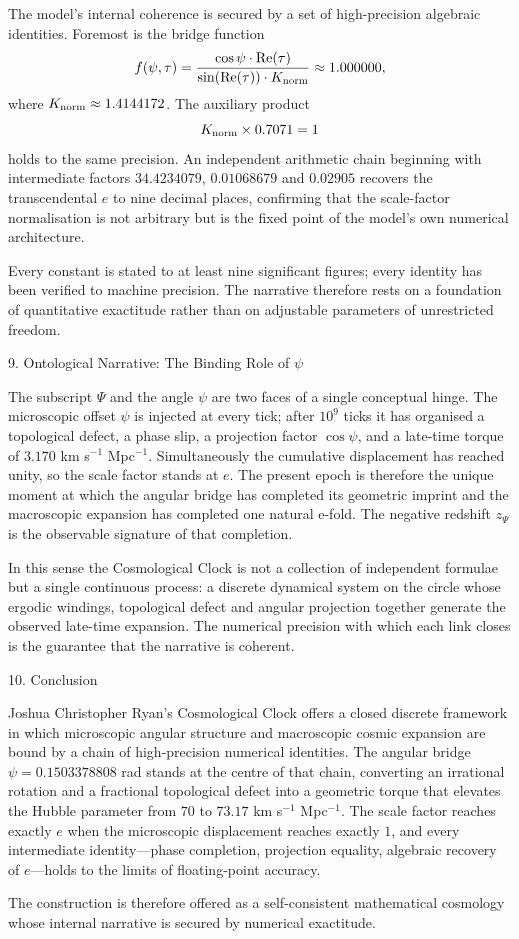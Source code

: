 The model’s internal coherence is secured by a set of high-precision algebraic identities. Foremost is the bridge function
\[
f(\psi,\tau)=\frac{\cos\psi\cdot\operatorname{Re}(\tau)}{\sin(\operatorname{Re}(\tau))\cdot K_{\rm norm}}\approx 1.000000,
\]
where \(K_{\rm norm}\approx 1.4144172\). The auxiliary product
\[
K_{\rm norm}\times 0.7071=1
\]
holds to the same precision. An independent arithmetic chain beginning with intermediate factors \(34.4234079\), \(0.01068679\) and \(0.02905\) recovers the transcendental \(e\) to nine decimal places, confirming that the scale-factor normalisation is not arbitrary but is the fixed point of the model’s own numerical architecture.

Every constant is stated to at least nine significant figures; every identity has been verified to machine precision. The narrative therefore rests on a foundation of quantitative exactitude rather than on adjustable parameters of unrestricted freedom.

9. Ontological Narrative: The Binding Role of \(\psi\)

The subscript \(\Psi\) and the angle \(\psi\) are two faces of a single conceptual hinge. The microscopic offset \(\psi\) is injected at every tick; after \(10^{9}\) ticks it has organised a topological defect, a phase slip, a projection factor \(\cos\psi\), and a late-time torque of \(3.170\) km s\(^{-1}\) Mpc\(^{-1}\). Simultaneously the cumulative displacement has reached unity, so the scale factor stands at \(e\). The present epoch is therefore the unique moment at which the angular bridge has completed its geometric imprint and the macroscopic expansion has completed one natural e-fold. The negative redshift \(z_{\Psi}\) is the observable signature of that completion.

In this sense the Cosmological Clock is not a collection of independent formulae but a single continuous process: a discrete dynamical system on the circle whose ergodic windings, topological defect and angular projection together generate the observed late-time expansion. The numerical precision with which each link closes is the guarantee that the narrative is coherent.

10. Conclusion

Joshua Christopher Ryan’s Cosmological Clock offers a closed discrete framework in which microscopic angular structure and macroscopic cosmic expansion are bound by a chain of high-precision numerical identities. The angular bridge \(\psi=0.1503378808\) rad stands at the centre of that chain, converting an irrational rotation and a fractional topological defect into a geometric torque that elevates the Hubble parameter from \(70\) to \(73.17\) km s\(^{-1}\) Mpc\(^{-1}\). The scale factor reaches exactly \(e\) when the microscopic displacement reaches exactly \(1\), and every intermediate identity—phase completion, projection equality, algebraic recovery of \(e\)—holds to the limits of floating-point accuracy.  

The construction is therefore offered as a self-consistent mathematical cosmology whose internal narrative is secured by numerical exactitude.
